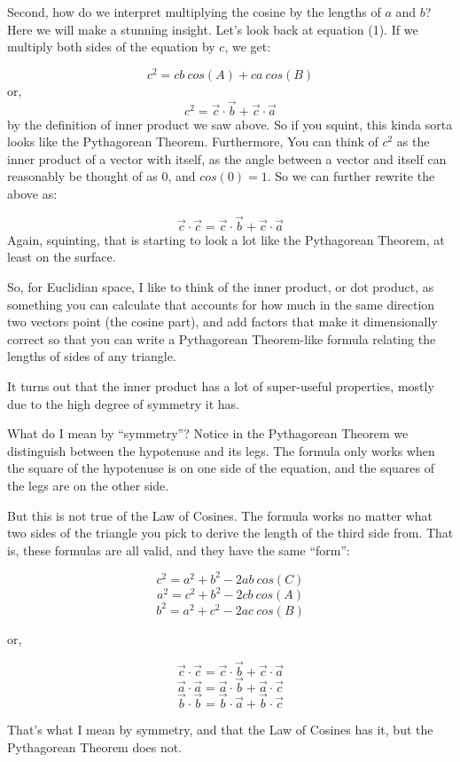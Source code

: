 \documentclass[
]{book}
\begin{document}
Second, how do we interpret multiplying the cosine by the lengths of \(a\) and \(b\)? Here we will make a stunning insight. Let's look back at equation (1). If we multiply both sides of the equation by \(c\), we get:

\[c^2 = cb\ cos(A) + ca\ cos(B)\]
or,
\[c^2 = \vec{c}\cdot\vec{b} + \vec{c}\cdot\vec{a}\]
by the definition of inner product we saw above. So if you squint, this kinda sorta looks like the Pythagorean Theorem. Furthermore, You can think of \(c^2\) as the inner product of a vector with itself, as the angle between a vector and itself can reasonably be thought of as 0, and \(cos(0) = 1\). So we can further rewrite the above as:

\[\vec{c}\cdot\vec{c} = \vec{c}\cdot\vec{b} + \vec{c}\cdot\vec{a}\]
Again, squinting, that is starting to look a lot like the Pythagorean Theorem, at least on the surface.

So, for Euclidian space, I like to think of the inner product, or dot product, as something you can calculate that accounts for how much in the same direction two vectors point (the cosine part), and add factors that make it dimensionally correct so that you can write a Pythagorean Theorem-like formula relating the lengths of sides of any triangle.

It turns out that the inner product has a lot of super-useful properties, mostly due to the high degree of symmetry it has.

What do I mean by ``symmetry''? Notice in the Pythagorean Theorem we distinguish between the hypotenuse and its legs. The formula only works when the square of the hypotenuse is on one side of the equation, and the squares of the legs are on the other side.

But this is not true of the Law of Cosines. The formula works no matter what two sides of the triangle you pick to derive the length of the third side from. That is, these formulas are all valid, and they have the same ``form'':

\[c^2 = a^2 + b^2 - 2 a b \ cos(C)\]
\[a^2 = c^2 + b^2 - 2 c b \ cos(A)\]
\[b^2 = a^2 + c^2 - 2 a c \ cos(B)\]

or,

\[\vec{c}\cdot\vec{c} = \vec{c}\cdot\vec{b} + \vec{c}\cdot\vec{a}\]
\[\vec{a}\cdot\vec{a} = \vec{a}\cdot\vec{b} + \vec{a}\cdot\vec{c}\]
\[\vec{b}\cdot\vec{b} = \vec{b}\cdot\vec{a} + \vec{b}\cdot\vec{c}\]

That's what I mean by symmetry, and that the Law of Cosines has it, but the Pythagorean Theorem does not.
\end{document}
